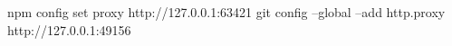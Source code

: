 npm config set proxy http://127.0.0.1:63421
git config --global --add http.proxy http://127.0.0.1:49156